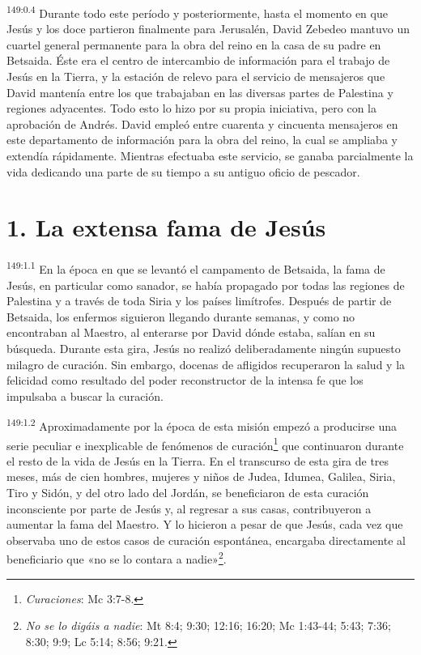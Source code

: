 \par 
\textsuperscript{149:0.4} Durante todo este período y posteriormente, hasta el momento en que Jesús y los doce partieron finalmente para Jerusalén, David Zebedeo mantuvo un cuartel general permanente para la obra del reino en la casa de su padre en Betsaida. Éste era el centro de intercambio de información para el trabajo de Jesús en la Tierra, y la estación de relevo para el servicio de mensajeros que David mantenía entre los que trabajaban en las diversas partes de Palestina y regiones adyacentes. Todo esto lo hizo por su propia iniciativa, pero con la aprobación de Andrés. David empleó entre cuarenta y cincuenta mensajeros en este departamento de información para la obra del reino, la cual se ampliaba y extendía rápidamente. Mientras efectuaba este servicio, se ganaba parcialmente la vida dedicando una parte de su tiempo a su antiguo oficio de pescador.

\section*{1. La extensa fama de Jesús}
\par 
\textsuperscript{149:1.1} En la época en que se levantó el campamento de Betsaida, la fama de Jesús, en particular como sanador, se había propagado por todas las regiones de Palestina y a través de toda Siria y los países limítrofes. Después de partir de Betsaida, los enfermos siguieron llegando durante semanas, y como no encontraban al Maestro, al enterarse por David dónde estaba, salían en su búsqueda. Durante esta gira, Jesús no realizó deliberadamente ningún supuesto milagro de curación. Sin embargo, docenas de afligidos recuperaron la salud y la felicidad como resultado del poder reconstructor de la intensa fe que los impulsaba a buscar la curación.

\par 
\textsuperscript{149:1.2} Aproximadamente por la época de esta misión empezó a producirse una serie peculiar e inexplicable de fenómenos de curación\footnote{\textit{Curaciones}: Mc 3:7-8.} que continuaron durante el resto de la vida de Jesús en la Tierra. En el transcurso de esta gira de tres meses, más de cien hombres, mujeres y niños de Judea, Idumea, Galilea, Siria, Tiro y Sidón, y del otro lado del Jordán, se beneficiaron de esta curación inconsciente por parte de Jesús y, al regresar a sus casas, contribuyeron a aumentar la fama del Maestro. Y lo hicieron a pesar de que Jesús, cada vez que observaba uno de estos casos de curación espontánea, encargaba directamente al beneficiario que «no se lo contara a nadie»\footnote{\textit{No se lo digáis a nadie}: Mt 8:4; 9:30; 12:16; 16:20; Mc 1:43-44; 5:43; 7:36; 8:30; 9:9; Lc 5:14; 8:56; 9:21.}.


